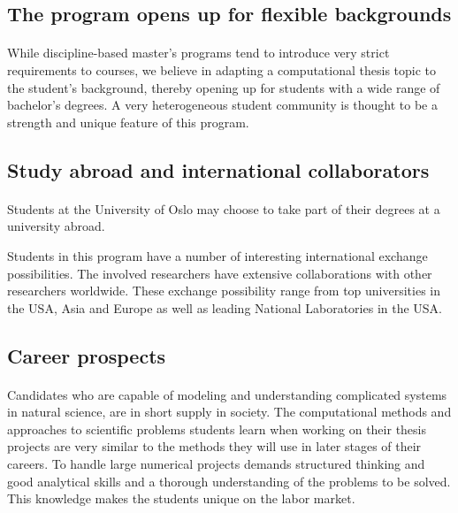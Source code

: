 \documentclass[%
oneside,                 %
final,                   %
10pt]{article}
\begin{document}
\subsection*{The program opens up for flexible backgrounds}


\paragraph{}
While discipline-based master's programs tend to introduce very strict
requirements to courses, we believe in adapting a computational thesis
topic to the student's background, thereby opening up for
students with a wide range of bachelor's degrees.
A very heterogeneous student community is thought to be a strength and
unique feature of this program.



\subsection*{Study abroad and international collaborators}


\paragraph{}

Students at the University of Oslo may choose to take part of
their degrees at a university abroad.

Students in this program have a number of interesting international
exchange possibilities. The involved researchers have extensive
collaborations with other researchers worldwide. These exchange
possibility range from top universities in the USA, Asia and Europe as
well as leading National Laboratories in the USA.



\subsection*{Career prospects}


\paragraph{}
Candidates who are capable of modeling and understanding complicated
systems in natural science, are in short supply in society.  The
computational methods and approaches to scientific problems students learn
when working on their thesis projects are very similar to the methods
they will use in later stages of their careers.  To handle large
numerical projects demands structured thinking and good analytical
skills and a thorough understanding of the problems to be solved. This
knowledge makes the students unique on the labor market.
\end{document}
